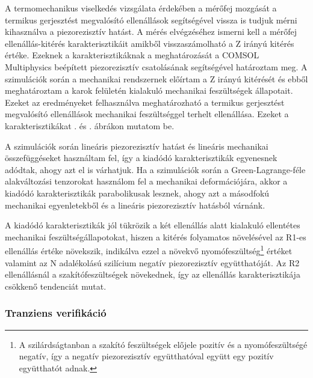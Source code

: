 A termomechanikus viselkedés vizsgálata érdekében a mérőfej mozgását a termikus gerjesztést megvalósító ellenállások segítségével vissza is tudjuk mérni kihasználva a piezorezisztív hatást. A mérés elvégzéséhez ismerni kell a mérőfej ellenállás-kitérés karakterisztikáit amikből visszaszámolható a Z irányú kitérés értéke. Ezeknek a karakterisztikáknak a meghatározását a COMSOL Multiphysics beépített piezorezisztív csatolásának segítségével határoztam meg. A szimulációk során a mechanikai rendszernek előírtam a Z irányú kitérését és ebből meghatároztam a karok felületén kialakuló mechanikai feszültségek állapotait. Ezeket az eredményeket felhasználva meghatározható a termikus gerjesztést megvalósító ellenállások mechanikai feszültséggel terhelt ellenállása. Ezeket a karakterisztikákat . és . ábrákon mutatom be.


A szimulációk során lineáris piezorezisztív hatást és lineáris mechanikai összefüggéseket használtam fel, így a kiadódó karakterisztikák egyenesnek adódtak, ahogy azt el is várhatjuk. Ha a szimulációk során a Green-Lagrange-féle alakváltozási tenzorokat használom fel a mechanikai deformációjára, akkor a kiadódó karakterisztikák parabolikusak lesznek, ahogy azt a másodfokú mechanikai egyenletekből és a lineáris piezorezisztív hatásból várnánk.

A kiadódó karakterisztikák jól tükrözik a két ellenállás alatt kialakuló ellentétes mechanikai feszültségállapotokat, hiszen a kitérés folyamatos növelésével az R1-es ellenállás értéke növekszik, indikálva ezzel a növekvő nyomófeszültség\footnote{A szilárdságtanban a szakító feszültségek előjele pozitív és a nyomófeszültségé negatív, így a negatív piezorezisztív együtthatóval együtt egy pozitív együtthatót adnak.} értéket valamint az N adalékolású szilícium negatív piezorezisztív együtthatóját\cite{piezoresistivity}. Az R2 ellenállásnál a szakítófeszültségek növekednek, így az ellenállás karakterisztikája csökkenő tendenciát mutat.

\subsubsection{Tranziens verifikáció}

